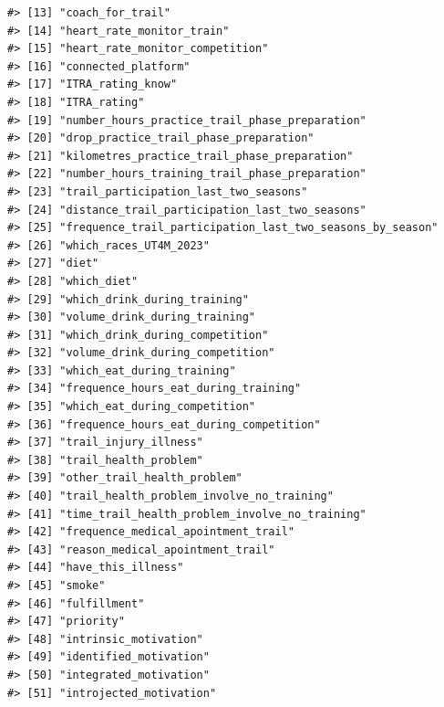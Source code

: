 \documentclass[
]{article}
\begin{document}
\begin{verbatim}
#> [13] "coach_for_trail"                                         
#> [14] "heart_rate_monitor_train"                                
#> [15] "heart_rate_monitor_competition"                          
#> [16] "connected_platform"                                      
#> [17] "ITRA_rating_know"                                        
#> [18] "ITRA_rating"                                             
#> [19] "number_hours_practice_trail_phase_preparation"           
#> [20] "drop_practice_trail_phase_preparation"                   
#> [21] "kilometres_practice_trail_phase_preparation"             
#> [22] "number_hours_training_trail_phase_preparation"           
#> [23] "trail_participation_last_two_seasons"                    
#> [24] "distance_trail_participation_last_two_seasons"           
#> [25] "frequence_trail_participation_last_two_seasons_by_season"
#> [26] "which_races_UT4M_2023"                                   
#> [27] "diet"                                                    
#> [28] "which_diet"                                              
#> [29] "which_drink_during_training"                             
#> [30] "volume_drink_during_training"                            
#> [31] "which_drink_during_competition"                          
#> [32] "volume_drink_during_competition"                         
#> [33] "which_eat_during_training"                               
#> [34] "frequence_hours_eat_during_training"                     
#> [35] "which_eat_during_competition"                            
#> [36] "frequence_hours_eat_during_competition"                  
#> [37] "trail_injury_illness"                                    
#> [38] "trail_health_problem"                                    
#> [39] "other_trail_health_problem"                              
#> [40] "trail_health_problem_involve_no_training"                
#> [41] "time_trail_health_problem_involve_no_training"           
#> [42] "frequence_medical_apointment_trail"                      
#> [43] "reason_medical_apointment_trail"                         
#> [44] "have_this_illness"                                       
#> [45] "smoke"                                                   
#> [46] "fulfillment"                                             
#> [47] "priority"                                                
#> [48] "intrinsic_motivation"                                    
#> [49] "identified_motivation"                                   
#> [50] "integrated_motivation"                                   
#> [51] "introjected_motivation"                                  

\end{verbatim}
\end{document}

